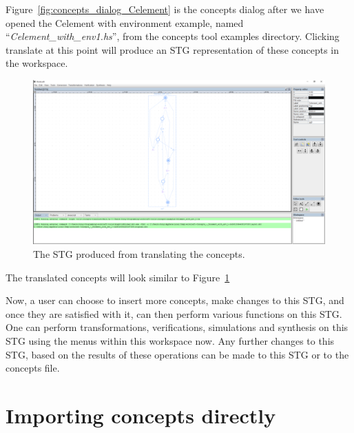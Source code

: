 \documentclass{proc}
\begin{document}
Figure~\ref{fig:concepts_dialog_Celement} is the concepts dialog after we have opened the Celement with environment example, named ``\emph{Celement\_with\_env1.hs}'', from the 
concepts tool examples directory. Clicking translate at this point will produce an STG representation of these concepts in the workspace. 

\begin{figure}[H]
\begin{centering}
\includegraphics[scale=0.2]{images/concepts_translated}
\par\end{centering}

\begin{centering}
\protect\caption{\label{fig:concepts_translated}The STG produced from translating the concepts.}

\par\end{centering}

\end{figure}

The translated concepts will look similar to Figure~\ref{fig:concepts_translated}

Now, a user can choose to insert more concepts, make changes to this STG, and once they are satisfied with it, can then perform various functions on this STG. One can perform 
transformations, verifications, simulations and synthesis on this STG using the menus within this workspace now. Any further changes to this STG, based on the results of these operations 
can be made to this STG or to the concepts file. 

\section{Importing concepts directly}
\end{document}

